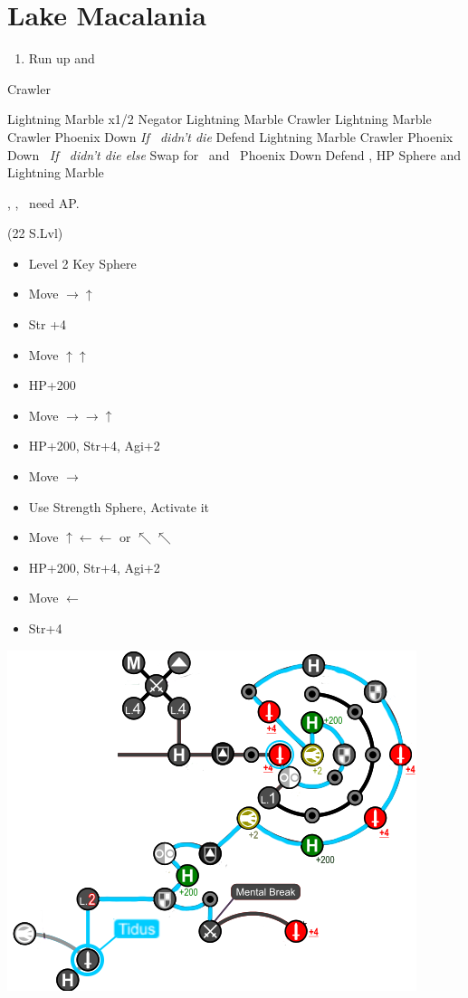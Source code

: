 \chapter{Lake Macalania}

\begin{enumerate}
	\item Run up and \sd
\end{enumerate}
\begin{battle}[1600]{Crawler}
	\begin{itemize}
		\switch{\tidus}{\rikku}
		\rikkuf Lightning Marble x1/2 Negator
		\rikkuf Lightning Marble Crawler
		\kimahrif Lightning Marble Crawler
		\luluf Phoenix Down \rikku
		\switch{\kimahri}{\yuna} \textit{If \kimahri\ didn't die}
		\yunaf Defend
		\rikkuf Lightning Marble Crawler
		\luluf Phoenix Down \rikku\ \textit{If \kimahri\ didn't die else} Swap for \yuna\ and \yuna\ Phoenix Down \rikku
		\switch{\yuna}{\tidus}
		\tidusf Defend
		\rikkuf \od, HP Sphere and Lightning Marble
	\end{itemize}
	\tidus, \yuna, \lulu\ need AP.
\end{battle}
\begin{spheregrid}
	\begin{itemize}
		\tidusf (22 S.Lvl)
		\begin{itemize}
			\item Level 2 Key Sphere
			\item Move $\rightarrow\uparrow$
			\item Str +4
			\item Move $\uparrow\uparrow$
			\item HP+200
			\item Move $\rightarrow\rightarrow\uparrow$
			\item HP+200, Str+4, Agi+2
			\item Move $\rightarrow$
			\item Use Strength Sphere, Activate it
			\item Move $\uparrow\leftarrow\leftarrow$ or $\nwarrow\nwarrow$
			\item HP+200, Str+4, Agi+2
			\item Move $\leftarrow$
			\item Str+4
		\end{itemize}
		\includegraphics[width=.8\columnwidth]{graphics/Tidus_post_crawler}
	\end{itemize}
\end{spheregrid}
